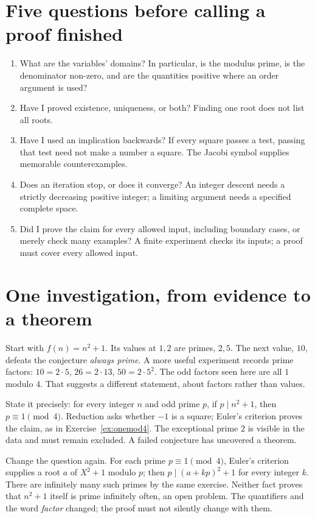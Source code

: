 \section*{Five questions before calling a proof finished}
\begin{enumerate}
\item What are the variables' domains? In particular, is the modulus prime, is the denominator non-zero,
and are the quantities positive where an order argument is used?
\item Have I proved existence, uniqueness, or both? Finding one root does not list all roots.
\item Have I used an implication backwards? If every square passes a test, passing that test need not make a
number a square. The Jacobi symbol supplies memorable counterexamples.
\item Does an iteration stop, or does it converge? An integer descent needs a strictly decreasing positive
integer; a limiting argument needs a specified complete space.
\item Did I prove the claim for every allowed input, including boundary cases, or merely check many examples?
A finite experiment checks its inputs; a proof must cover every allowed input.
\end{enumerate}

\section*{One investigation, from evidence to a theorem}
Start with $f(n)=n^2+1$. Its values at $1,2$ are primes, $2,5$.
The next value, $10$, defeats the conjecture \emph{always prime}.
A more useful experiment records prime factors:
$10=2\cdot5$, $26=2\cdot13$, $50=2\cdot5^2$.
The odd factors seen here are all $1$ modulo $4$.
That suggests a different statement, about factors rather than values.

State it precisely: for every integer $n$ and odd prime $p$,
if $p\mid n^2+1$, then $p\equiv1\pmod4$.
Reduction asks whether $-1$ is a square; Euler's criterion proves the claim,
as in Exercise~\ref{ex:onemod4}. The exceptional prime $2$ is visible in the
data and must remain excluded. A failed conjecture has uncovered a theorem.

Change the question again. For each prime $p\equiv1\pmod4$,
Euler's criterion supplies a root $a$ of $X^2+1$ modulo $p$;
then $p\mid(a+kp)^2+1$ for every integer $k$.
There are infinitely many such primes by the same exercise.
Neither fact proves that $n^2+1$ itself is prime infinitely often,
an open problem. The quantifiers and the word \emph{factor} changed;
the proof must not silently change with them.

